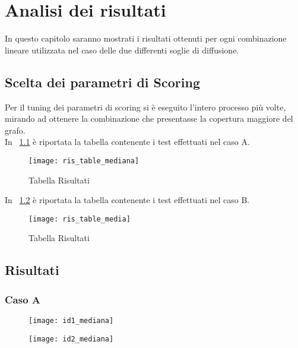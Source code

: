 
\chapter{Analisi dei risultati}
In questo capitolo saranno mostrati i risultati ottenuti per ogni combinazione
lineare utilizzata nel caso delle due differenti soglie di diffusione.

\section{Scelta dei parametri di Scoring}
Per il tuning dei parametri di scoring si è eseguito l'intero processo più volte,
mirando ad ottenere la combinazione che presentasse la copertura maggiore del grafo.\\
In \figurename~\ref{ris_table_mediana} è riportata la tabella contenente i test effettuati
nel caso A.

\begin{figure}[!htbp]
  \texttt{[image: ris\_table\_mediana]}
  \caption{Tabella Risultati }
  \label{ris_table_mediana}
\end{figure}
\clearpage
In \figurename~\ref{ris_table_media} è riportata la tabella contenente i test effettuati
nel caso B.

\begin{figure}[!htbp]
  \texttt{[image: ris\_table\_media]}
  \caption{Tabella Risultati }
  \label{ris_table_media}
\end{figure}

\section{Risultati}
\subsection{Caso A}

\begin{figure}[!htbp]
  \texttt{[image: id1\_mediana]}
  \label{id1_mediana}
\end{figure}


\begin{figure}[!htbp]
  \texttt{[image: id2\_mediana]}
  \label{id2_mediana}
\end{figure}


